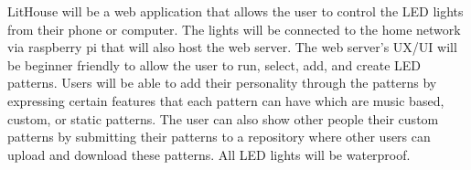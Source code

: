 LitHouse will be a web application that allows the user to control the LED lights from their phone or computer. The lights will be connected to the home network via raspberry pi that will also host the web server. The web server's UX/UI will be beginner friendly to allow the user to run, select, add, and create LED patterns. Users will be able to add their personality through the patterns by expressing certain features that each pattern can have which are music based, custom, or static patterns. The user can also show other people their custom patterns by submitting their patterns to a repository where other users can upload and download these patterns. All LED lights will be  waterproof.